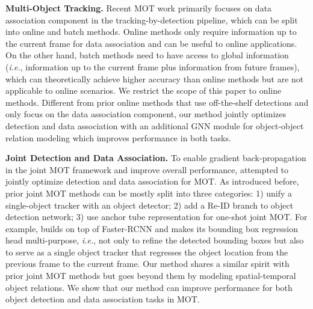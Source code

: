 \documentclass[letterpaper, 10 pt, conference]{ieeeconf}
\begin{document}
\vspace{2mm}\noindent\textbf{Multi-Object Tracking.} Recent MOT work primarily focuses on data association component in the tracking-by-detection pipeline, which can be split into online and batch methods. Online methods \cite{Bewley2016, Weng2020_AB3DMOT, Zhang2019, Zhu2018_MOT} only require information up to the current frame for data association and can be useful to online applications. On the other hand, batch methods \cite{Milan2014, Pirsiavash2011, B2016_mot, Brendel2011, Dehghan2015, RoshanZamir2012} need to have access to global information (\emph{i.e.}, information up to the current frame plus information from future frames), which can theoretically achieve higher accuracy than online methods but are not applicable to online scenarios. We restrict the scope of this paper to online methods.  Different from prior online methods that use off-the-shelf detections and only focus on the data association component, our method jointly optimizes detection and data association with an additional GNN module for object-object relation modeling which improves performance in both tasks. 

\vspace{2mm}\noindent\textbf{Joint Detection and Data Association.} To enable gradient back-propagation in the joint MOT framework and improve overall performance, \cite{B2016, Feichtenhofer2017, Bergmann2019, zhou2020tracking, Voigtlaender2019, Wang2019, zhang2020fairmot, peng2020chainedtracker, pang2020tubetk, Sun2020} attempted to jointly optimize detection and data association for MOT. As introduced before, prior joint MOT methods can be mostly split into three categories: 1) unify a single-object tracker with an object detector; 2) add a Re-ID branch to object detection network; 3) use anchor tube representation for one-shot joint MOT. For example, \cite{Bergmann2019} builds on top of Faster-RCNN \cite{Ren2015} and makes its bounding box regression head multi-purpose, \emph{i.e.}, not only to refine the detected bounding boxes but also to serve as a single object tracker that regresses the object location from the previous frame to the current frame. Our method shares a similar spirit with prior joint MOT methods but goes beyond them by modeling spatial-temporal object relations. We show that our method can improve performance for both object detection and data association tasks in MOT.
\end{document}
